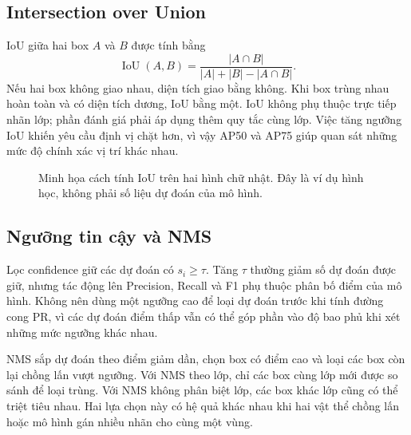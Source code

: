\subsection{Intersection over Union}
IoU giữa hai box $A$ và $B$ được tính bằng
\begin{equation}
\operatorname{IoU}(A,B)=\frac{|A\cap B|}{|A|+|B|-|A\cap B|}.
\end{equation}
Nếu hai box không giao nhau, diện tích giao bằng không. Khi box trùng nhau hoàn toàn và có diện tích dương, IoU bằng một. IoU không phụ thuộc trực tiếp nhãn lớp; phần đánh giá phải áp dụng thêm quy tắc cùng lớp. Việc tăng ngưỡng IoU khiến yêu cầu định vị chặt hơn, vì vậy AP50 và AP75 giúp quan sát những mức độ chính xác vị trí khác nhau.

\begin{figure}[H]\centering
{}
\caption{Minh họa cách tính IoU trên hai hình chữ nhật. Đây là ví dụ hình học, không phải số liệu dự đoán của mô hình.}
\end{figure}

\subsection{Ngưỡng tin cậy và NMS}
Lọc confidence giữ các dự đoán có $s_i\geq\tau$. Tăng $\tau$ thường giảm số dự đoán được giữ, nhưng tác động lên Precision, Recall và F1 phụ thuộc phân bố điểm của mô hình. Không nên dùng một ngưỡng cao để loại dự đoán trước khi tính đường cong PR, vì các dự đoán điểm thấp vẫn có thể góp phần vào độ bao phủ khi xét những mức ngưỡng khác nhau.

NMS sắp dự đoán theo điểm giảm dần, chọn box có điểm cao và loại các box còn lại chồng lấn vượt ngưỡng. Với NMS theo lớp, chỉ các box cùng lớp mới được so sánh để loại trùng. Với NMS không phân biệt lớp, các box khác lớp cũng có thể triệt tiêu nhau. Hai lựa chọn này có hệ quả khác nhau khi hai vật thể chồng lấn hoặc mô hình gán nhiều nhãn cho cùng một vùng.

